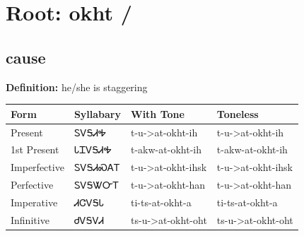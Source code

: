 \documentclass{article}%
\begin{document}
%
\normalsize%
\section*{Root: okht / }%
\subsection*{cause}%
\textbf{Definition: }%
he/she is staggering%
\\[0.5em]%
\begin{tabular}{|l|l|l|l|}%
\hline%
\textbf{Form}&\textbf{Syllabary}&\textbf{With Tone}&\textbf{Toneless}\\%
\hline%
Present&ᏚᏙᎦᏗᎭ&t{-}u{-}>at{-}okht{-}ih&t{-}u{-}>at{-}okht{-}ih\\%
1st Present&ᏓᏆᏙᎦᏗᎭ&t{-}akw{-}at{-}okht{-}ih&t{-}akw{-}at{-}okht{-}ih\\%
Imperfective&ᏚᏙᎦᏗᏍᎪᎢ&t{-}u{-}>at{-}okht{-}ihsk&t{-}u{-}>at{-}okht{-}ihsk\\%
Perfective&ᏚᏙᎦᏔᏅᎢ&t{-}u{-}>at{-}okht{-}han&t{-}u{-}>at{-}okht{-}han\\%
Imperative&ᏗᏣᏙᎦᏓ&ti{-}ts{-}at{-}okht{-}a&ti{-}ts{-}at{-}okht{-}a\\%
Infinitive&ᏧᏙᎦᏙᏗ&ts{-}u{-}>at{-}okht{-}oht&ts{-}u{-}>at{-}okht{-}oht\\%
\hline%
\end{tabular}%
\\[1em]%
\end{document}
